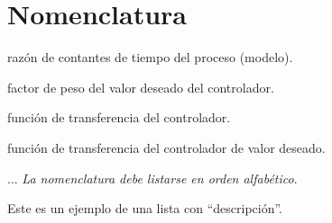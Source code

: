 
\chapter{Nomenclatura}

\begin{description}[labelindent=1cm,labelwidth=2.25cm,align=left,leftmargin=3.45cm]  %
	\item[$a$] razón de contantes de tiempo del proceso (modelo).
	\item[$\beta$] factor de peso del valor deseado del controlador.
	\item[$C(s)$] función de transferencia del controlador.
	\item[$C_r(s)$] función de transferencia del controlador de valor deseado.
	\item[$y(t)$, $y(s)$] ... \emph{La nomenclatura debe listarse en orden alfabético}.
	\item[$\zeta$] Este es un ejemplo de una lista con ``descripción''.
\end{description}
